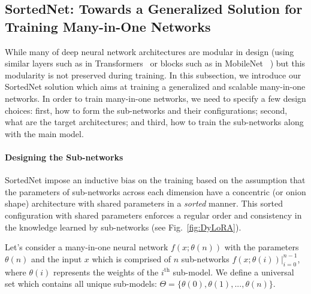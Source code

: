 \documentclass[letterpaper]{article} %
\begin{document}



\subsection{SortedNet: Towards a Generalized Solution for Training Many-in-One Networks}
While many of deep neural network architectures are modular in design (using similar layers such as in Transformers~\cite{vaswani2017attention} or blocks such as in MobileNet~ \cite{sandler2018mobilenetv2}) but this modularity is not preserved during training. 
In this subsection, we introduce our SortedNet solution which aims at training a generalized and scalable many-in-one networks. In order to train many-in-one networks, we need to specify a few design choices: first, how to form the sub-networks and their configurations; second, what are the target architectures; and third, how to train the sub-networks along with the main model. 


\paragraph{Designing the Sub-networks}
SortedNet impose an inductive bias on the training based on the assumption that the parameters of sub-networks across each dimension have a concentric (or onion shape) architecture with shared parameters in a \textit{sorted} manner. 
This sorted configuration with shared parameters enforces a regular order and consistency in the knowledge learned by sub-networks (see Fig.~\ref{fig:DyLoRA}).

Let's consider a many-in-one neural network $f(x;\theta (n))$ with the parameters $\theta(n)$ and the input $x$ which is comprised of $n$ sub-networks $f(x;\theta (i)) |_{i=0}^{n-1}$, where $\theta(i)$ represents the weights of the $i^{\text{th}}$ sub-model. We define a universal set which contains all unique sub-models: $\Theta= \{\theta(0), \theta(1), ..., \theta(n) \}$.  
\end{document}
